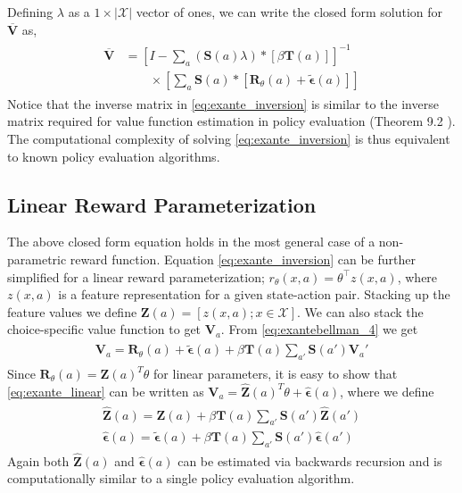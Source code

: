 \documentclass{article}
\begin{document}
Defining $\lambda$ as a $1\times|\mathcal{X}|$ vector of ones, we can write the closed form solution for $\overline{\mathbf{V}}$ as,
\begin{align} \label{eq:exante_inversion}
\begin{split}
\overline{\mathbf{V}} &=\left[I-\sum_{a}(\mathbf{S}(a) \lambda) *\left[ \beta \mathbf{T}(a)  \right]\right]^{-1} \\
& \qquad \times \left[\sum_{a}\mathbf{S}(a) *\left[ \mathbf{R}_{\theta}(a)+\tilde{\bm{\epsilon}}(a)\right]\right]
\end{split}
\end{align}
Notice that the inverse matrix in \eqref{eq:exante_inversion} is similar to the inverse matrix required for value function estimation in policy evaluation (Theorem 9.2 \cite{ziebart_phd}). The computational complexity of solving \eqref{eq:exante_inversion} is thus equivalent to known policy evaluation algorithms.

\subsection{Linear Reward Parameterization}

The above closed form equation holds in the most general case of a non-parametric reward function. Equation \eqref{eq:exante_inversion} can be further simplified for a linear reward parameterization; $r_{\theta}(x,a) = \theta^{\top} z(x,a)$, where $z(x, a)$ is a feature representation for a given state-action pair. Stacking up the feature values we define $\mathbf{Z}(a) = [z(x, a); x \in \mathcal{X}]$. We can also stack the choice-specific value function to get $\mathbf{V}_a$. From \eqref{eq:exantebellman_4} we get
\begin{align} \label{eq:exante_linear}
    \begin{split}
    \mathbf{V}_a=\mathbf{R}_{\theta}(a)+\tilde{\bm{\epsilon}}(a)+\beta \mathbf{T}(a) \sum_{a'}\mathbf{S}(a')\mathbf{V}_a'
    \end{split}
\end{align}
Since $\mathbf{R}_{\theta}(a) = \mathbf{Z}(a)^T\theta$ for linear parameters, it is easy to show that \eqref{eq:exante_linear} can be written as $\mathbf{V}_a = \hat{\mathbf{Z}}(a)^T\theta + \hat{\bm{\epsilon}}(a)$, where we define
\begin{align} \label{eq:choice_specific_Z_tilde}
\begin{split}
    \hat{\mathbf{Z}}(a) = \mathbf{Z}(a) + \beta\mathbf{T}(a)\sum_{a'}\mathbf{S}(a')\hat{\mathbf{Z}}(a') \\
    \hat{\bm{\epsilon}}(a) = \tilde{\bm{\epsilon}}(a) + \beta\mathbf{T}(a)\sum_{a'}\mathbf{S}(a')\hat{\bm{\epsilon}}(a')
\end{split}    
\end{align}
Again both $\hat{\mathbf{Z}}(a)$ and $\hat{\bm{\epsilon}}(a)$ can be estimated via backwards recursion and is computationally similar to a single policy evaluation algorithm.
\end{document}
